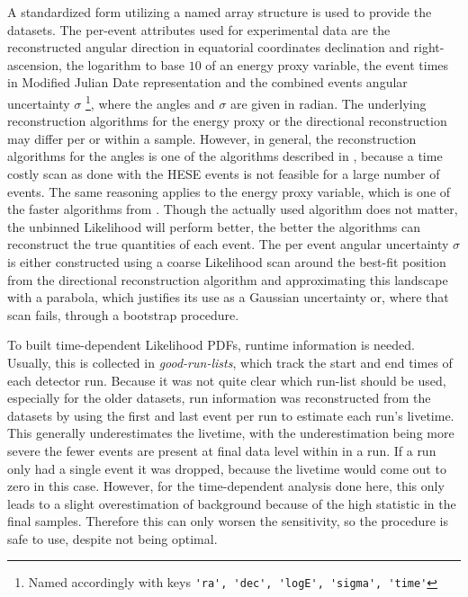 A standardized form utilizing a named array structure is used to provide the datasets.
The per-event attributes used for experimental data are the reconstructed angular direction in equatorial coordinates declination and right-ascension, the logarithm to base $\num{10}$ of an energy proxy variable, the event times in Modified Julian Date representation \cite{Hohenkerk:1992AstroAlmanac} and the combined events angular uncertainty $\sigma$ \footnote{Named accordingly with keys \lstinline!'ra', 'dec', 'logE', 'sigma', 'time'!}, where the angles and $\sigma$ are given in radian.
The underlying reconstruction algorithms for the energy proxy or the directional reconstruction may differ per or within a sample.
However, in general, the reconstruction algorithms for the angles is one of the algorithms described in \cite{Ahrens:2003fg}, because a time costly scan as done with the HESE events is not feasible for a large number of events.
The same reasoning applies to the energy proxy variable, which is one of the faster algorithms from \cite{Aartsen:2013vja}.
Though the actually used algorithm does not matter, the unbinned Likelihood will perform better, the better the algorithms can reconstruct the true quantities of each event.
The per event angular uncertainty $\sigma$ is either constructed using a coarse Likelihood scan around the best-fit position from the directional reconstruction algorithm and approximating this landscape with a parabola, which justifies its use as a Gaussian uncertainty or, where that scan fails, through a bootstrap procedure.

To built time-dependent Likelihood PDFs, runtime information is needed.
Usually, this is collected in \emph{good-run-lists}, which track the start and end times of each detector run.
Because it was not quite clear which run-list should be used, especially for the older datasets, run information was reconstructed from the datasets by using the first and last event per run to estimate each run's livetime.
This generally underestimates the livetime, with the underestimation being more severe the fewer events are present at final data level within in a run.
If a run only had a single event it was dropped, because the livetime would come out to zero in this case.
However, for the time-dependent analysis done here, this only leads to a slight overestimation of background because of the high statistic in the final samples.
Therefore this can only worsen the sensitivity, so the procedure is safe to use, despite not being optimal.

